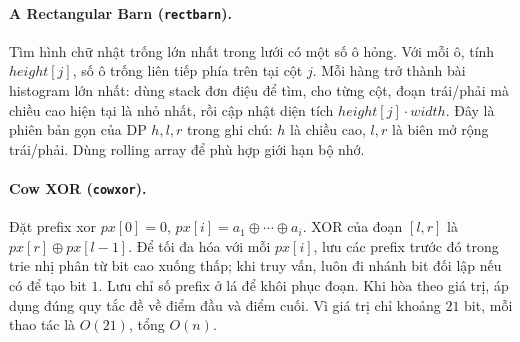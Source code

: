 \documentclass[11pt]{article}
\newcommand{\problem}[2]{\paragraph{#1 (\texttt{#2}).}}
\newcommand{\bigO}[1]{\ensuremath{O(#1)}}
\begin{document}
\problem{A Rectangular Barn}{rectbarn}
Tìm hình chữ nhật trống lớn nhất trong lưới có một số ô hỏng. Với mỗi ô, tính \(height[j]\), số ô trống liên tiếp phía trên tại cột \(j\). Mỗi hàng trở thành bài histogram lớn nhất: dùng stack đơn điệu để tìm, cho từng cột, đoạn trái/phải mà chiều cao hiện tại là nhỏ nhất, rồi cập nhật diện tích \(height[j]\cdot width\). Đây là phiên bản gọn của DP \(h,l,r\) trong ghi chú: \(h\) là chiều cao, \(l,r\) là biên mở rộng trái/phải. Dùng rolling array để phù hợp giới hạn bộ nhớ.

\problem{Cow XOR}{cowxor}
Đặt prefix xor \(px[0]=0\), \(px[i]=a_1\oplus\cdots\oplus a_i\). XOR của đoạn \([l,r]\) là \(px[r]\oplus px[l-1]\). Để tối đa hóa với mỗi \(px[i]\), lưu các prefix trước đó trong trie nhị phân từ bit cao xuống thấp; khi truy vấn, luôn đi nhánh bit đối lập nếu có để tạo bit \(1\). Lưu chỉ số prefix ở lá để khôi phục đoạn. Khi hòa theo giá trị, áp dụng đúng quy tắc đề về điểm đầu và điểm cuối. Vì giá trị chỉ khoảng \(21\) bit, mỗi thao tác là \(\bigO{21}\), tổng \(\bigO{n}\).
\end{document}
